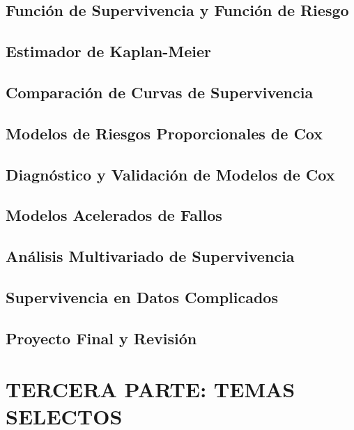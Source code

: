 \documentclass{report}
\begin{document}
\chapter{Función de Supervivencia y Función de Riesgo}


\chapter{Estimador de Kaplan-Meier}


\chapter{Comparación de Curvas de Supervivencia}


\chapter{Modelos de Riesgos Proporcionales de Cox}


\chapter{Diagnóstico y Validación de Modelos de Cox}


\chapter{Modelos Acelerados de Fallos}


\chapter{Análisis Multivariado de Supervivencia}


\chapter{Supervivencia en Datos Complicados}

\chapter{Proyecto Final y Revisión}


\part{TERCERA PARTE: TEMAS SELECTOS}
\end{document}

